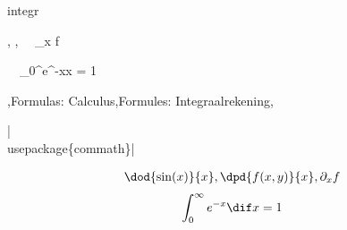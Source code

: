 \begin{saveblock}{integr}
	\begin{highlightblock}[gobble=8]
		, , \partial~~_x f
		
		\int~~_{0}^{\infty}e^{-x}\dif x = 1
	\end{highlightblock}
\end{saveblock}


\begin{frame}
	{\lang,Formulas: Calculus,Formules: Integraalrekening,}

	\hll|\\usepackage\{commath\}|


	\begin{align*}
		\dod{\sin(x)}{x}, \dpd{f(x,y)}{x}, \partial_x f
	\end{align*}
	\begin{align*}
		\int_{0}^{\infty}e^{-x}\dif x = 1
	\end{align*}
\end{frame}

	

		

